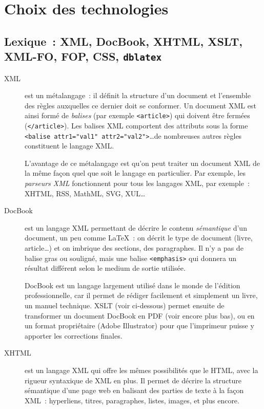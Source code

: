 \documentclass[final,11pt,a4paper,twoside,titlepage]{article}
\newcommand{\p}{\vspace{0.3em}}
\newcommand{\code}[1]{\texttt{#1}}
\begin{document}
{  \section{Choix des technologies}
    \subsection{Lexique~: XML, DocBook, XHTML, XSLT, XML-FO, FOP, CSS, \texttt{dblatex}}
      \begin{description}
        \item[XML] est un métalangage~: il définit la structure d'un document
          et l'ensemble des règles auxquelles ce dernier doit se conformer. Un
          document XML est ainsi formé de \emph{balises} (par exemple
          \code{<article>}) qui doivent être fermées (\code{</article>}). Les
          balises XML comportent des attributs sous la forme \code{<balise
          attr1="val1" attr2="val2">}\ldots de nombreuses autres règles
          constituent le langage XML.

          L'avantage de ce métalangage est qu'on peut traiter un document XML
          de la même façon quel que soit le langage en particulier. Par exemple,
          les \emph{parseurs XML} fonctionnent pour tous les langages XML, par
          exemple~: XHTML, RSS, MathML, SVG, XUL\ldots \p

        \item[DocBook] est un langage XML permettant de décrire le contenu
          \emph{sémantique} d'un document, un peu comme \LaTeX{}~: on décrit le
          type de document (livre, article\ldots) et on imbrique des sections,
          des paragraphes. Il n'y a pas de balise gras ou souligné, mais une
          balise \code{<emphasis>} qui donnera un résultat différent selon le
          medium de sortie utilisée.

          DocBook est un langage largement utilisé dans le monde de l'édition
          professionnelle, car il permet de rédiger facilement et simplement un
          livre, un manuel technique. XSLT (voir ci-dessous) permet ensuite de
          transformer un document DocBook en PDF (voir encore plus bas), ou en
          un format propriétaire (Adobe Illustrator) pour que l'imprimeur puisse
          y apporter les corrections finales. \p

        \item[XHTML] est un langage XML qui offre les mêmes possibilités que le
          HTML, avec la rigueur syntaxique de XML en plus. Il permet de décrire
          la structure sémantique d'une page web en balisant des parties de texte
          à la façon XML~: hyperliens, titres, paragraphes, listes, images, et
          plus encore. \p


\end{description}}
\end{document}
